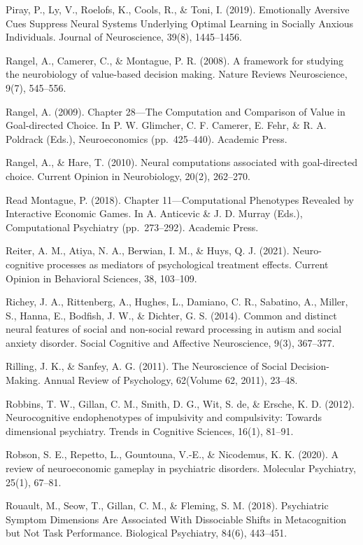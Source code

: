 \documentclass[12pt,a4paper,oneside,]{book} %
\begin{document}
Piray, P., Ly, V., Roelofs, K., Cools, R., \& Toni, I. (2019). Emotionally Aversive Cues Suppress Neural Systems Underlying Optimal Learning in Socially Anxious Individuals. Journal of Neuroscience, 39(8), 1445--1456.

Rangel, A., Camerer, C., \& Montague, P. R. (2008). A framework for studying the neurobiology of value-based decision making. Nature Reviews Neuroscience, 9(7), 545--556.

Rangel, A. (2009). Chapter 28---The Computation and Comparison of Value in Goal-directed Choice. In P. W. Glimcher, C. F. Camerer, E. Fehr, \& R. A. Poldrack (Eds.), Neuroeconomics (pp.~425--440). Academic Press.

Rangel, A., \& Hare, T. (2010). Neural computations associated with goal-directed choice. Current Opinion in Neurobiology, 20(2), 262--270.

Read Montague, P. (2018). Chapter 11---Computational Phenotypes Revealed by Interactive Economic Games. In A. Anticevic \& J. D. Murray (Eds.), Computational Psychiatry (pp.~273--292). Academic Press.

Reiter, A. M., Atiya, N. A., Berwian, I. M., \& Huys, Q. J. (2021). Neuro-cognitive processes as mediators of psychological treatment effects. Current Opinion in Behavioral Sciences, 38, 103--109.

Richey, J. A., Rittenberg, A., Hughes, L., Damiano, C. R., Sabatino, A., Miller, S., Hanna, E., Bodfish, J. W., \& Dichter, G. S. (2014). Common and distinct neural features of social and non-social reward processing in autism and social anxiety disorder. Social Cognitive and Affective Neuroscience, 9(3), 367--377.

Rilling, J. K., \& Sanfey, A. G. (2011). The Neuroscience of Social Decision-Making. Annual Review of Psychology, 62(Volume 62, 2011), 23--48.

Robbins, T. W., Gillan, C. M., Smith, D. G., Wit, S. de, \& Ersche, K. D. (2012). Neurocognitive endophenotypes of impulsivity and compulsivity: Towards dimensional psychiatry. Trends in Cognitive Sciences, 16(1), 81--91.

Robson, S. E., Repetto, L., Gountouna, V.-E., \& Nicodemus, K. K. (2020). A review of neuroeconomic gameplay in psychiatric disorders. Molecular Psychiatry, 25(1), 67--81.

Rouault, M., Seow, T., Gillan, C. M., \& Fleming, S. M. (2018). Psychiatric Symptom Dimensions Are Associated With Dissociable Shifts in Metacognition but Not Task Performance. Biological Psychiatry, 84(6), 443--451.
\end{document}
